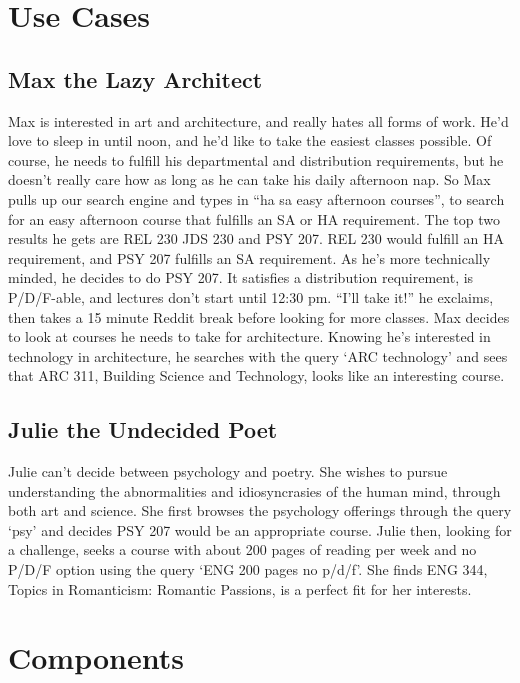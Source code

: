 \documentclass[12pt,letterpaper]{article}
\begin{document}
\section{Use Cases}
\subsection{Max the Lazy Architect}
Max is interested in art and architecture, and really hates all forms of work. He'd love to sleep in until noon, and he'd like to take the easiest classes possible. Of course, he needs to fulfill his departmental and distribution requirements, but he doesn't really care how as long as he can take his daily afternoon nap. So Max pulls up our search engine and types in ``ha sa easy afternoon courses'', to search for an easy afternoon course that fulfills an SA or HA requirement. The top two results he gets are REL 230 JDS 230 and PSY 207. REL 230 would fulfill an HA requirement, and PSY 207 fulfills an SA requirement. As he's more technically minded, he decides to do PSY 207. It satisfies a distribution requirement, is P/D/F-able, and lectures don't start until 12:30 pm. ``I'll take it!'' he exclaims, then takes a 15 minute Reddit break before looking for more classes. Max decides to look at courses he needs to take for architecture. Knowing he's interested in technology in architecture, he searches with the query `ARC technology' and sees that ARC 311, Building Science and Technology, looks like an interesting course.
		
\subsection{Julie the Undecided Poet}
Julie can't decide between psychology and poetry. She wishes to pursue understanding the abnormalities and idiosyncrasies of the human mind, through both art and science. She first browses the psychology offerings through the query `psy' and decides PSY 207 would be an appropriate course. Julie then, looking for a challenge, seeks a course with about 200 pages of reading per week and no P/D/F option using the query `ENG 200 pages no p/d/f'. She finds ENG 344, Topics in Romanticism: Romantic Passions, is a perfect fit for her interests.  

\section{Components}
\end{document}
